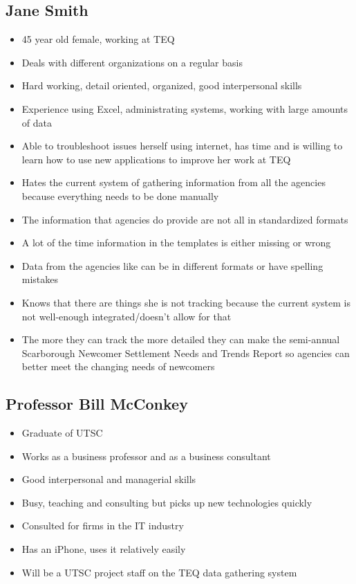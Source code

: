 \documentclass[12pt]{article}
\begin{document}
\subsection{Jane Smith}
\begin{itemize}%
\item 45 year old female, working at TEQ
\item Deals with different organizations on a regular basis
\item Hard working, detail oriented, organized, good interpersonal skills
\item Experience using Excel, administrating systems, working with large amounts of data
\item Able to troubleshoot issues herself using internet, has time and is willing to learn how to use new applications to improve her work at TEQ
\item Hates the current system of gathering information from all the agencies because everything needs to be done manually
\item The information that agencies do provide are not all in standardized formats
\item A lot of the time information in the templates is either missing or wrong
\item Data from the agencies like can be in different formats or have spelling mistakes
\item Knows that there are things she is not tracking because the current system is not well-enough integrated/doesn't allow for that
\item The more they can track the more detailed they can make the semi-annual Scarborough Newcomer Settlement Needs and Trends Report so agencies can better meet the changing needs of newcomers
 \end{itemize}
 
 \subsection{Professor Bill McConkey}
\begin{itemize}%
\item Graduate of UTSC
\item Works as a business professor and as a business consultant	
\item Good interpersonal and managerial skills
\item Busy, teaching and consulting but picks up new technologies quickly
\item Consulted for firms in the IT industry
\item Has an iPhone, uses it relatively easily
\item Will be a UTSC project staff on the TEQ data gathering system
 \end{itemize}
\end{document}
